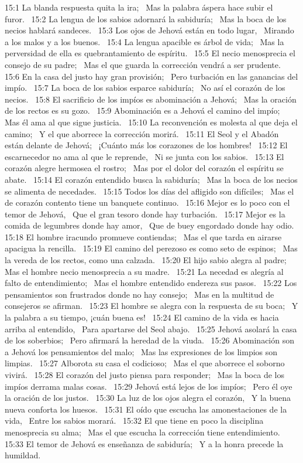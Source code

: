15:1 La blanda respuesta quita la ira;  
Mas la palabra áspera hace subir el furor.  
15:2 La lengua de los sabios adornará la sabiduría;  
Mas la boca de los necios hablará sandeces.  
15:3 Los ojos de Jehová están en todo lugar,  
Mirando a los malos y a los buenos.  
15:4 La lengua apacible es árbol de vida;  
Mas la perversidad de ella es quebrantamiento de espíritu.  
15:5 El necio menosprecia el consejo de su padre;  
Mas el que guarda la corrección vendrá a ser prudente.  
15:6 En la casa del justo hay gran provisión;  
Pero turbación en las ganancias del impío.  
15:7 La boca de los sabios esparce sabiduría;  
No así el corazón de los necios.  
15:8 El sacrificio de los impíos es abominación a Jehová;  
Mas la oración de los rectos es su gozo.  
15:9 Abominación es a Jehová el camino del impío;  
Mas él ama al que sigue justicia.  
15:10 La reconvención es molesta al que deja el camino;  
Y el que aborrece la corrección morirá.  
15:11 El Seol y el Abadón están delante de Jehová;  
¡Cuánto más los corazones de los hombres!  
15:12 El escarnecedor no ama al que le reprende,  
Ni se junta con los sabios.  
15:13 El corazón alegre hermosea el rostro;  
Mas por el dolor del corazón el espíritu se abate.  
15:14 El corazón entendido busca la sabiduría;  
Mas la boca de los necios se alimenta de necedades.  
15:15 Todos los días del afligido son difíciles;  
Mas el de corazón contento tiene un banquete continuo.  
15:16 Mejor es lo poco con el temor de Jehová,  
Que el gran tesoro donde hay turbación.  
15:17 Mejor es la comida de legumbres donde hay amor,  
Que de buey engordado donde hay odio.  
15:18 El hombre iracundo promueve contiendas;  
Mas el que tarda en airarse apacigua la rencilla.  
15:19 El camino del perezoso es como seto de espinos;  
Mas la vereda de los rectos, como una calzada.  
15:20 El hijo sabio alegra al padre;  
Mas el hombre necio menosprecia a su madre.  
15:21 La necedad es alegría al falto de entendimiento;  
Mas el hombre entendido endereza sus pasos.  
15:22 Los pensamientos son frustrados donde no hay consejo;  
Mas en la multitud de consejeros se afirman.  
15:23 El hombre se alegra con la respuesta de su boca;  
Y la palabra a su tiempo, ¡cuán buena es!  
15:24 El camino de la vida es hacia arriba al entendido,  
Para apartarse del Seol abajo.  
15:25 Jehová asolará la casa de los soberbios;  
Pero afirmará la heredad de la viuda.  
15:26 Abominación son a Jehová los pensamientos del malo;  
Mas las expresiones de los limpios son limpias.  
15:27 Alborota su casa el codicioso;  
Mas el que aborrece el soborno vivirá.  
15:28 El corazón del justo piensa para responder;  
Mas la boca de los impíos derrama malas cosas.  
15:29 Jehová está lejos de los impíos;  
Pero él oye la oración de los justos.  
15:30 La luz de los ojos alegra el corazón,  
Y la buena nueva conforta los huesos.  
15:31 El oído que escucha las amonestaciones de la vida,  
Entre los sabios morará.  
15:32 El que tiene en poco la disciplina menosprecia su alma;  
Mas el que escucha la corrección tiene entendimiento.  
15:33 El temor de Jehová es enseñanza de sabiduría;  
Y a la honra precede la humildad.  

